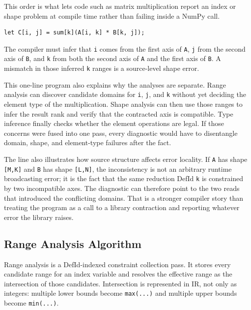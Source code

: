 This order is what lets code such as matrix multiplication report an index or
shape problem at compile time rather than failing inside a NumPy call.

\begin{lstlisting}[style=einlang]
let C[i, j] = sum[k](A[i, k] * B[k, j]);
\end{lstlisting}

The compiler must infer that \texttt{i} comes from the first axis of
\texttt{A}, \texttt{j} from the second axis of \texttt{B}, and \texttt{k} from
both the second axis of \texttt{A} and the first axis of \texttt{B}. A mismatch
in those inferred \texttt{k} ranges is a source-level shape error.

This one-line program also explains why the analyses are separate. Range
analysis can discover candidate domains for \texttt{i}, \texttt{j}, and
\texttt{k} without yet deciding the element type of the multiplication. Shape
analysis can then use those ranges to infer the result rank and verify that the
contracted axis is compatible. Type inference finally checks whether the
element operations are legal. If those concerns were fused into one pass, every
diagnostic would have to disentangle domain, shape, and element-type failures
after the fact.

The line also illustrates how source structure affects error locality. If
\texttt{A} has shape \texttt{[M,K]} and \texttt{B} has shape \texttt{[L,N]},
the inconsistency is not an arbitrary runtime broadcasting error; it is the fact
that the same reduction DefId \texttt{k} is constrained by two incompatible
axes. The diagnostic can therefore point to the two reads that introduced the
conflicting domains. That is a stronger compiler story than treating the
program as a call to a library contraction and reporting whatever error the
library raises.

\subsection{Range Analysis Algorithm}

Range analysis is a DefId-indexed constraint collection pass. It stores every
candidate range for an index variable and resolves the effective range as the
intersection of those candidates. Intersection is represented in IR, not only
as integers: multiple lower bounds become \texttt{max(...)} and multiple upper
bounds become \texttt{min(...)}.

